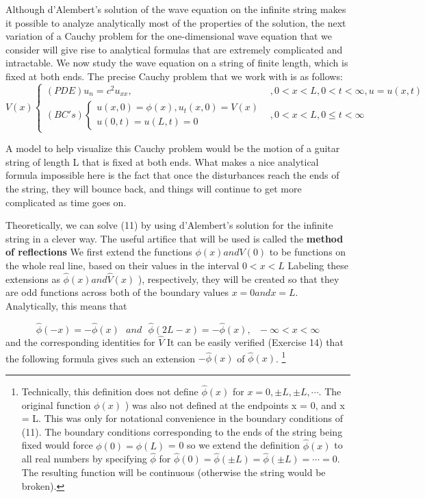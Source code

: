 \documentclass[../main.tex]{subfiles}
\begin{document}
Although d'Alembert's solution of the wave equation on the infinite string makes
it possible to analyze analytically most of the properties of the solution, the next
variation of a Cauchy problem for the one-dimensional wave equation that we
consider will give rise to analytical formulas that are extremely complicated and
intractable. We now study the wave equation on a string of finite length, which is
fixed at both ends. The precise Cauchy problem that we work with is as follows:
\begin{equation}
V(x)
	\begin{cases} 
(PDE) u_n=c^2 u_{xx}, &  ,0 < x < L, 0< t< \infty ,  u=u(x,t)\\
(BC's)
		\begin{cases}
		u(x,0)=\phi(x), u_t(x,0)=V(x)\\
		u(0,t)=u(L,t)=0
		\end{cases} 
		& ,0 < x < L, 0\leqslant t  < \infty
	\end{cases}
\end{equation}

A model to help visualize this Cauchy problem would be the motion of a guitar
string of length L that is fixed at both ends. What makes a nice analytical formula
impossible here is the fact that once the disturbances reach the ends of the string,
they will bounce back, and things will continue to get more complicated as time
goes on.

Theoretically, we can solve (11) by using d'Alembert's solution for the infinite
string in a clever way. The useful artifice that will be used is called the \textbf{method of
reflections} We first extend the functions $\phi(x) and V(0)$  to be functions on the
whole real line, based on their values in the interval $ 0< x < L$  Labeling these
extensions as $\hat{\phi}(x) and \hat{V}(x)$ ), respectively, they will be created so that they are
odd functions across both of the boundary values $x = 0 and x = L$. Analytically,
this means that

\begin{equation}
\hat{\phi}(-x)= -\hat{\phi}(x) ~~~and~~~ \hat{\phi}(2L - x) = -\hat{\phi}(x),~~~ -\infty < x<\infty
\end{equation}
and the corresponding identities for $\hat{V}$ It can be easily verified (Exercise 14)
that the following formula gives such an extension $-\hat{\phi}(x)$ of $\hat{\phi}(x)$.
\footnote{ Technically, this definition does not define
$\hat{\phi}(x)$ for $x=0, \pm L, \pm L, \cdots .$ The original function $\phi(x)$ ) was also not defined at the endpoints x = 0, and x = L. This was only for notational convenience
in the boundary conditions of (11). The boundary conditions corresponding to the ends of the string
being fixed would force   $\phi(0) = \phi(L)$ = 0 so we extend the definition $\hat{\phi}(x)$ to all real numbers by
specifying $\hat{\phi}$ for $\hat{\phi}(0)=\hat{\phi} (\pm L) =\hat{\phi}(\pm L) = \cdots =0.$  The resulting function will be continuous (otherwise the
string would be broken). }
\end{document}
